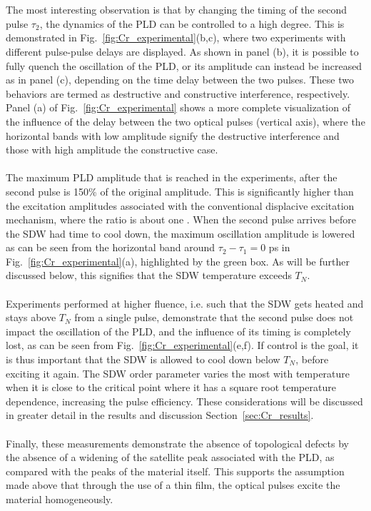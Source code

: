 \\\\
The most interesting observation is that by changing the timing of the second pulse $\tau_2$, the dynamics of the PLD can be controlled to a high degree.
This is demonstrated in Fig.~\ref{fig:Cr_experimental}(b,c), where two experiments with different pulse-pulse delays are displayed.
As shown in panel (b), it is possible to fully quench the oscillation of the PLD, or its amplitude can instead be increased as in panel (c), depending on the time delay between the two pulses.
These two behaviors are termed as destructive and constructive interference, respectively.
Panel (a) of Fig.~\ref{fig:Cr_experimental} shows a more complete visualization of the influence of the delay between the two optical pulses (vertical axis), where the horizontal bands with low amplitude signify the destructive interference and those with high amplitude the constructive case.
\\\\
The maximum PLD amplitude that is reached in the experiments, after the second pulse is 150\% of the original amplitude.
This is significantly higher than the excitation amplitudes associated with the conventional displacive excitation mechanism, where the ratio is about one \cite{Singer2015prl,Zeiger1992}. 
When the second pulse arrives before the SDW had time to cool down, the maximum oscillation amplitude is lowered as can be seen from the horizontal band around $\tau_2 - \tau_1 = 0$ ps in Fig.~\ref{fig:Cr_experimental}(a), highlighted by the green box.
As will be further discussed below, this signifies that the SDW temperature exceeds $T_N$.
\\\\
Experiments performed at higher fluence, i.e. such that the SDW gets heated and stays above $T_N$ from a single pulse, demonstrate that the second pulse does not impact the oscillation of the PLD, and the influence of its timing is completely lost, as can be seen from Fig.~\ref{fig:Cr_experimental}(e,f).
If control is the goal, it is thus important that the SDW is allowed to cool down below $T_N$, before exciting it again.
The SDW order parameter varies the most with temperature when it is close to the critical point where it has a square root temperature dependence, increasing the pulse efficiency.
These considerations will be discussed in greater detail in the results and discussion Section~\ref{sec:Cr_results}.
\\\\
Finally, these measurements demonstrate the absence of topological defects by the absence of a widening of the satellite peak associated with the PLD, as compared with the peaks of the material itself.
This supports the assumption made above that through the use of a thin film, the optical pulses excite the material homogeneously. 
